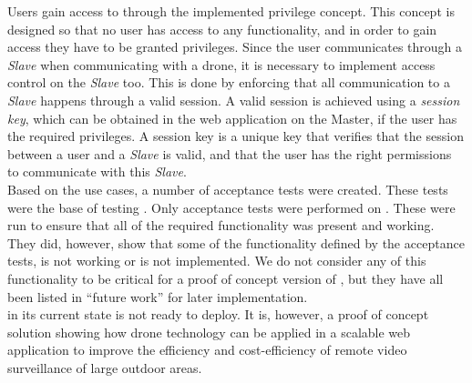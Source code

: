 Users gain access to \projectname{} through the implemented privilege concept. 
This concept is designed so that no user has access to any functionality, and in order to gain access they have to be granted privileges. 
Since the user communicates through a \emph{Slave} when communicating with a drone, it is necessary to implement access control on the \emph{Slave} too. 
This is done by enforcing that all communication to a \emph{Slave} happens through a valid session. 
A valid session is achieved using a \emph{session key}, which can be obtained in the web application on the Master, if the user has the required privileges. 
A session key is a unique key that verifies that the session between a user and a \emph{Slave} is valid, and that the user has the right permissions to communicate with this \emph{Slave}. \\

Based on the use cases, a number of acceptance tests were created.
These tests were the base of testing \projectname{}. 
Only acceptance tests were performed on \projectname{}. 
These were run to ensure that all of the required functionality was present and working. 
They did, however, show that some of the functionality defined by the acceptance tests, is not working or is not implemented. 
We do not consider any of this functionality to be critical for a proof of concept version of \projectname{}, but they have all been listed in ``future work'' for later implementation. \\

\projectname{} in its current state is not ready to deploy.
It is, however, a proof of concept solution showing how drone technology can be applied in a scalable web application to improve the efficiency and cost-efficiency of remote video surveillance of large outdoor areas.